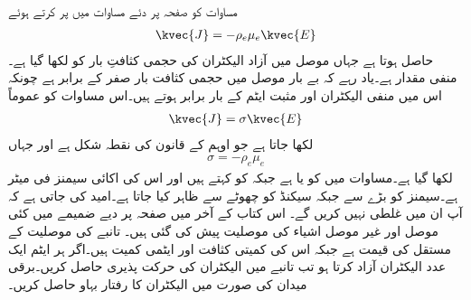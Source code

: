 مساوات  کو صفحہ  پر دئے مساوات  میں پر کرتے ہوئے
\begin{align}
\kvec{J}=-\rho_e \mu_e \kvec{E}
\end{align}
حاصل ہوتا ہے جہاں موصل میں آزاد الیکٹران کی حجمی کثافتِ بار کو  لکھا گیا ہے۔ منفی مقدار ہے۔یاد رہے کہ بے بار موصل میں حجمی کثافت بار صفر کے برابر ہے چونکہ اس میں منفی الیکٹران  اور مثبت ایٹم کے بار برابر ہوتے ہیں۔اس مساوات کو عموماً
\begin{align}\label{مساوات_کپیسٹر-اوہم_قانون_نقطہ_شکل}
\kvec{J}=\sigma \kvec{E}
\end{align}
لکھا جاتا ہے جو اوہم کے قانون کی نقطہ شکل ہے اور جہاں
\begin{align}\label{مساوات_کپیسٹر_موصلیت_تعریف}
\sigma=-\rho_e \mu_e
\end{align}
لکھا گیا ہے۔مساوات  میں  کو  یا  ہے جبکہ  کو  کہتے ہیں اور اس کی اکائی سیمنز فی میٹر  ہے۔سیمنز کو بڑے  سے  جبکہ سیکنڈ کو چھوٹے  سے ظاہر کیا جاتا ہے۔امید کی جاتی ہے کہ آپ ان میں غلطی نہیں کریں گے۔ اس کتاب کے آخر میں صفحہ  پر دیے ضمیمے میں کئی موصل اور غیر موصل اشیاء کی موصلیت پیش کی گئی ہیں۔
تانبے کی موصلیت کے مستقل  کی قیمت  ہے جبکہ اس کی کمیتی کثافت  اور ایٹمی کمیت  ہیں۔اگر ہر ایٹم ایک عدد الیکٹران آزاد کرتا ہو تب تانبے میں الیکٹران کی حرکت پذیری حاصل کریں۔برقی میدان  کی صورت میں الیکٹران کا رفتار بہاو حاصل کریں۔

